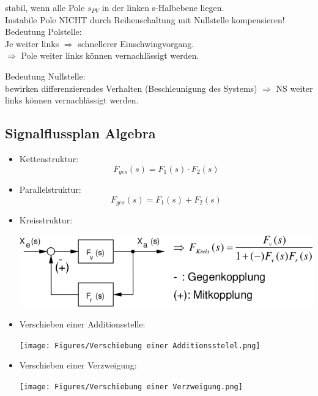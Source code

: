 \begin{mdframed}[style=exercise]
	stabil, wenn alle Pole $s_{PV}$ in der linken
	s-Halbebene liegen.\\ Instabile Pole
	NICHT durch Reihenschaltung mit Nullstelle kompensieren!\\
	Bedeutung Polstelle:\\
	Je weiter links $\Rightarrow$ schnellerer Einschwingvorgang.\\
	$\Rightarrow$ Pole weiter links können vernachlässigt werden.
\end{mdframed}
\begin{mdframed}[style=exercise]
	Bedeutung Nullstelle:\\
	bewirken differenzierendes Verhalten (Beschleunigung des Systems)
	$\Rightarrow$ NS weiter links können vernachlässigt werden.
\end{mdframed}

\subsection{Signalflussplan Algebra}
\begin{itemize}[leftmargin=*]
	\item Kettenstruktur:
	    \[F_{ges}(s) = F_1(s) \cdot F_2(s)\]

	\item Parallelstruktur:
		\[F_{ges}(s) = F_1(s) + F_2(s)\]

	\item Kreisstruktur:
	      \begin{center}
		      \includegraphics[width=0.96\columnwidth]{Figures/Kreisstruktur.png}
	      \end{center}

	\item Verschieben einer Additionsstelle:
	      \begin{center}
		      \texttt{[image: Figures/Verschiebung einer Additionsstelel.png]}
	      \end{center}

	\item Verschieben einer Verzweigung:
	      \begin{center}
		      \texttt{[image: Figures/Verschiebung einer Verzweigung.png]}
	      \end{center}
\end{itemize}
